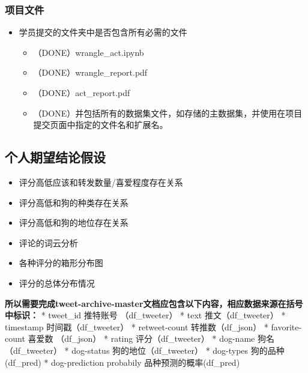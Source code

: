 \documentclass[11pt]{article}
\providecommand{\tightlist}{%
      \setlength{\itemsep}{0pt}\setlength{\parskip}{0pt}}
\begin{document}
\hypertarget{ux9879ux76eeux6587ux4ef6}{%
\subsubsection{项目文件}\label{ux9879ux76eeux6587ux4ef6}}

\begin{itemize}
\tightlist
\item
  学员提交的文件夹中是否包含所有必需的文件

  \begin{itemize}
  \tightlist
  \item
    （DONE）wrangle\_act.ipynb
  \item
    （DONE）wrangle\_report.pdf
  \item
    （DONE）act\_report.pdf
  \item
    （DONE）并包括所有的数据集文件，如存储的主数据集，并使用在项目提交页面中指定的文件名和扩展名。
  \end{itemize}
\end{itemize}

\hypertarget{ux4e2aux4ebaux671fux671bux7ed3ux8bbaux5047ux8bbe}{%
\subsection{个人期望结论假设}\label{ux4e2aux4ebaux671fux671bux7ed3ux8bbaux5047ux8bbe}}

\begin{itemize}
\tightlist
\item
  评分高低应该和转发数量/喜爱程度存在关系
\item
  评分高低和狗的种类存在关系
\item
  评分高低和狗的地位存在关系
\item
  评论的词云分析
\item
  各种评分的箱形分布图
\item
  评分的总体分布情况
\end{itemize}

\textbf{所以需要完成tweet-archive-master文档应包含以下内容，相应数据来源在括号中标识：}
* tweet\_id 推特账号 （df\_tweeter） * text 推文（df\_tweeter） *
timestamp 时间戳（df\_tweeter） * retweet-count 转推数（df\_json） *
favorite-count 喜爱数 （df\_json） * rating 评分（df\_tweeter） *
dog-name 狗名（df\_tweeter） * dog-status 狗的地位（df\_tweeter） *
dog-types 狗的品种(df\_pred) * dog-prediction probabily
品种预测的概率(df\_pred)
\end{document}
